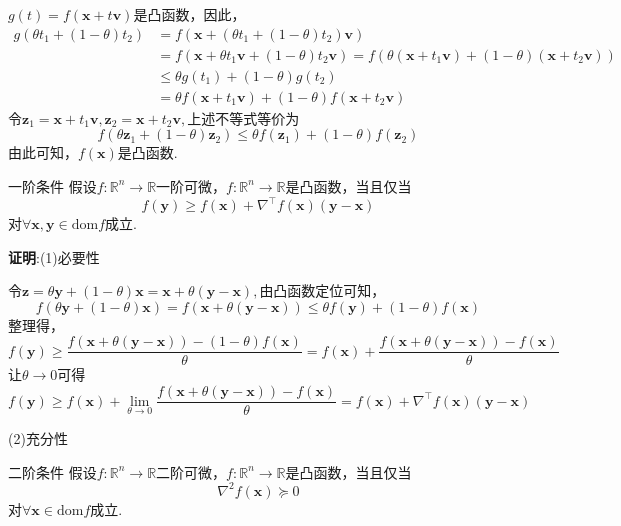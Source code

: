 $g(t)=f(\boldsymbol{x}+t\boldsymbol{v})$是凸函数，因此，\forall \theta \in \left[ 0,1 \right] 
$$
\begin{aligned}
g\left( \theta t_1+\left( 1-\theta \right) t_2 \right) &=f\left( \boldsymbol{x}+\left( \theta t_1+\left( 1-\theta \right) t_2 \right) \boldsymbol{v} \right) \\
&=f\left( \boldsymbol{x}+\theta t_1\boldsymbol{v}+\left( 1-\theta \right) t_2\boldsymbol{v} \right) =f\left( \theta \left( \boldsymbol{x}+t_1\boldsymbol{v} \right) +\left( 1-\theta \right) \left( \boldsymbol{x}+t_2\boldsymbol{v} \right) \right) \\
&\leqslant \theta g\left( t_1 \right) +\left( 1-\theta \right) g\left( t_2 \right)\\
&=\theta f\left( \boldsymbol{x}+t_1\boldsymbol{v} \right) +\left( 1-\theta \right) f\left( \boldsymbol{x}+t_2\boldsymbol{v} \right) 
\end{aligned}~
$$
令$\boldsymbol{z}_1=\boldsymbol{x}+t_1\boldsymbol{v},\boldsymbol{z}_2=\boldsymbol{x}+t_2\boldsymbol{v},$上述不等式等价为
$$
f\left( \theta \boldsymbol{z}_1+\left( 1-\theta \right) \boldsymbol{z}_2 \right) \leqslant \theta f\left( \boldsymbol{z}_1 \right) +\left( 1-\theta \right) f\left( \boldsymbol{z}_2 \right)~
$$
由此可知，$f(\boldsymbol{x})$是凸函数.
\begin{theorem}{一阶条件}
假设$f:\mathbb{R}^n\to\mathbb{R}$一阶可微，$f:\mathbb{R}^n\to\mathbb{R}$是凸函数，当且仅当
\begin{equation}
f(\boldsymbol{y})\geqslant f(\boldsymbol{x})+\nabla^\top f(\boldsymbol{x})(\boldsymbol{y}-\boldsymbol{x})~
\end{equation}
对$\forall\boldsymbol{x},\boldsymbol{y}\in\mathrm{dom} f$成立.
\end{theorem}
\textbf{证明}:(1)必要性

令$\boldsymbol{z}=\theta \boldsymbol{y}+\left( 1-\theta \right) \boldsymbol{x}=\boldsymbol{x}+\theta \left( \boldsymbol{y}-\boldsymbol{x} \right),$由凸函数定位可知，
$$
f\left( \theta \boldsymbol{y}+\left( 1-\theta \right) \boldsymbol{x} \right) =f\left( \boldsymbol{x}+\theta \left( \boldsymbol{y}-\boldsymbol{x} \right) \right) \leqslant \theta f\left( \boldsymbol{y} \right) +\left( 1-\theta \right) f\left( \boldsymbol{x} \right)~
$$
整理得，
$$
f\left( \boldsymbol{y} \right) \geqslant \frac{f\left( \boldsymbol{x}+\theta \left( \boldsymbol{y}-\boldsymbol{x} \right) \right) -\left( 1-\theta \right) f\left( \boldsymbol{x} \right)}{\theta}=f\left( \boldsymbol{x} \right) +\frac{f\left( \boldsymbol{x}+\theta \left( \boldsymbol{y}-\boldsymbol{x} \right) \right) -f\left( \boldsymbol{x} \right)}{\theta}~
$$
让$\theta\to 0$可得
$$
f\left( \boldsymbol{y} \right) \geqslant f\left( \boldsymbol{x} \right) +\lim_{\theta \rightarrow 0} \frac{f\left( \boldsymbol{x}+\theta \left( \boldsymbol{y}-\boldsymbol{x} \right) \right) -f\left( \boldsymbol{x} \right)}{\theta}=f\left( \boldsymbol{x} \right) +\nabla ^{\top}f\left( \boldsymbol{x} \right) \left( \boldsymbol{y}-\boldsymbol{x} \right)~
$$

(2)充分性




\begin{theorem}{二阶条件}
假设$f:\mathbb{R}^n\to\mathbb{R}$二阶可微，$f:\mathbb{R}^n\to\mathbb{R}$是凸函数，当且仅当
\begin{equation}
\nabla^2 f(\boldsymbol{x})\succeq 0~
\end{equation}
对$\forall\boldsymbol{x}\in\mathrm{dom} f$成立.
\end{theorem}